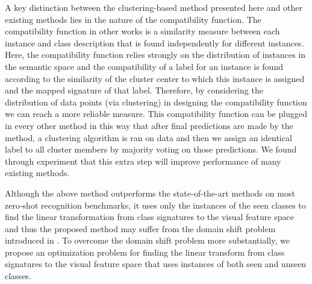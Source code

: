 \documentclass[letterpaper]{article}
\begin{document}


A key distinction between the clustering-based method presented here and other existing methods lies in the nature of the compatibility function.
 The compatibility function in other works is a similarity measure between each instance and class description that is found independently for different instances.
 Here, the compatibility function relies strongly on the distribution of instances in the semantic space and the compatibility of a label for an instance is found according to the similarity of the cluster center to which this instance is assigned and the mapped signature of that label. Therefore, by considering the distribution of data points (via clustering)
  in designing the compatibility function we can reach a more reliable measure.
  This compatibility function can be plugged in every other method in this way that after final predictions are made by the method,
a clustering algorithm is ran on data and then we assign an identical label to all cluster
members by majority voting on those predictions. We found through experiment that this extra step will improve performance of
many existing methods.

Although the above method outperforms the state-of-the-art methods on most zero-shot recognition benchmarks, it uses only the instances of the seen classes to find the linear transformation from class signatures to the visual feature space and thus the proposed method may suffer from the domain shift problem introduced in \cite{eccv14}.
To overcome the domain shift problem more substantially, we propose an optimization problem for finding the linear transform from class signatures to the visual feature space that uses instances of both seen and unseen classes.
\end{document}
